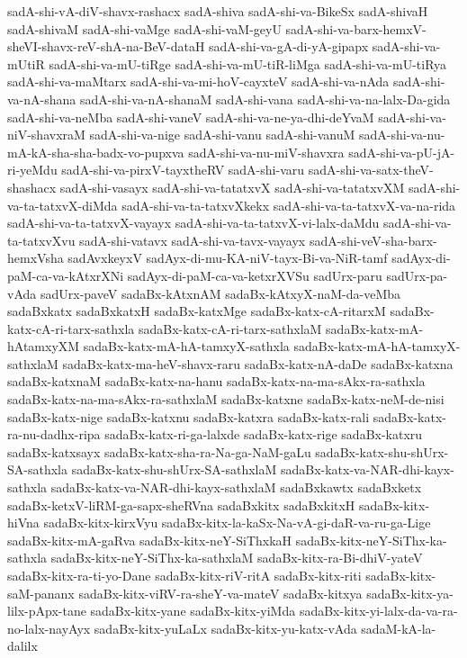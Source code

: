 {sadA-shi-vA-diV-shavx-rashacx
sadA-shiva
sadA-shi-va-BikeSx
sadA-shivaH
sadA-shivaM
sadA-shi-vaMge
sadA-shi-vaM-geyU
sadA-shi-va-barx-hemxV-sheVI-shavx-reV-shA-na-BeV-dataH
sadA-shi-va-gA-di-yA-gipapx
sadA-shi-va-mUtiR
sadA-shi-va-mU-tiRge
sadA-shi-va-mU-tiR-liMga
sadA-shi-va-mU-tiRya
sadA-shi-va-maMtarx
sadA-shi-va-mi-hoV-cayxteV
sadA-shi-va-nAda
sadA-shi-va-nA-shana
sadA-shi-va-nA-shanaM
sadA-shi-vana
sadA-shi-va-na-lalx-Da-gida
sadA-shi-va-neMba
sadA-shi-vaneV
sadA-shi-va-ne-ya-dhi-deYvaM
sadA-shi-va-niV-shavxraM
sadA-shi-va-nige
sadA-shi-vanu
sadA-shi-vanuM
sadA-shi-va-nu-mA-kA-sha-sha-badx-vo-pupxva
sadA-shi-va-nu-miV-shavxra
sadA-shi-va-pU-jA-ri-yeMdu
sadA-shi-va-pirxV-tayxtheRV
sadA-shi-varu
sadA-shi-va-satx-theV-shashacx
sadA-shi-vasayx
sadA-shi-va-tatatxvX
sadA-shi-va-tatatxvXM
sadA-shi-va-ta-tatxvX-diMda
sadA-shi-va-ta-tatxvXkekx
sadA-shi-va-ta-tatxvX-va-na-rida
sadA-shi-va-ta-tatxvX-vayayx
sadA-shi-va-ta-tatxvX-vi-lalx-daMdu
sadA-shi-va-ta-tatxvXvu
sadA-shi-vatavx
sadA-shi-va-tavx-vayayx
sadA-shi-veV-sha-barx-hemxVsha
sadAvxkeyxV
sadAyx-di-mu-KA-niV-tayx-Bi-va-NiR-tamf
sadAyx-di-paM-ca-va-kAtxrXNi
sadAyx-di-paM-ca-va-ketxrXVSu
sadUrx-paru
sadUrx-pa-vAda
sadUrx-paveV
sadaBx-kAtxnAM
sadaBx-kAtxyX-naM-da-veMba
sadaBxkatx
sadaBxkatxH
sadaBx-katxMge
sadaBx-katx-cA-ritarxM
sadaBx-katx-cA-ri-tarx-sathxla
sadaBx-katx-cA-ri-tarx-sathxlaM
sadaBx-katx-mA-hAtamxyXM
sadaBx-katx-mA-hA-tamxyX-sathxla
sadaBx-katx-mA-hA-tamxyX-sathxlaM
sadaBx-katx-ma-heV-shavx-raru
sadaBx-katx-nA-daDe
sadaBx-katxna
sadaBx-katxnaM
sadaBx-katx-na-hanu
sadaBx-katx-na-ma-sAkx-ra-sathxla
sadaBx-katx-na-ma-sAkx-ra-sathxlaM
sadaBx-katxne
sadaBx-katx-neM-de-nisi
sadaBx-katx-nige
sadaBx-katxnu
sadaBx-katxra
sadaBx-katx-rali
sadaBx-katx-ra-nu-dadhx-ripa
sadaBx-katx-ri-ga-lalxde
sadaBx-katx-rige
sadaBx-katxru
sadaBx-katxsayx
sadaBx-katx-sha-ra-Na-ga-NaM-gaLu
sadaBx-katx-shu-shUrx-SA-sathxla
sadaBx-katx-shu-shUrx-SA-sathxlaM
sadaBx-katx-va-NAR-dhi-kayx-sathxla
sadaBx-katx-va-NAR-dhi-kayx-sathxlaM
sadaBxkawtx
sadaBxketx
sadaBx-ketxV-liRM-ga-sapx-sheRVna
sadaBxkitx
sadaBxkitxH
sadaBx-kitx-hiVna
sadaBx-kitx-kirxVyu
sadaBx-kitx-la-kaSx-Na-vA-gi-daR-va-ru-ga-Lige
sadaBx-kitx-mA-gaRva
sadaBx-kitx-neY-SiThxkaH
sadaBx-kitx-neY-SiThx-ka-sathxla
sadaBx-kitx-neY-SiThx-ka-sathxlaM
sadaBx-kitx-ra-Bi-dhiV-yateV
sadaBx-kitx-ra-ti-yo-Dane
sadaBx-kitx-riV-ritA
sadaBx-kitx-riti
sadaBx-kitx-saM-pananx
sadaBx-kitx-viRV-ra-sheY-va-mateV
sadaBx-kitxya
sadaBx-kitx-ya-lilx-pApx-tane
sadaBx-kitx-yane
sadaBx-kitx-yiMda
sadaBx-kitx-yi-lalx-da-va-ra-no-lalx-nayAyx
sadaBx-kitx-yuLaLx
sadaBx-kitx-yu-katx-vAda
sadaM-kA-la-dalilx
}
